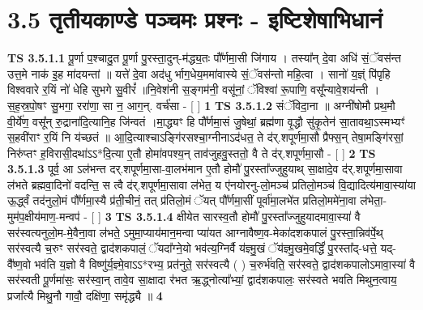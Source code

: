 \documentclass[17pt]{extarticle}
\begin{document}
     \section*{ 3.5      तृतीयकाण्डे पञ्चमः प्रश्नः - इष्टिशेषाभिधानं }
                                        \textbf{ TS 3.5.1.1} \newline
                  पू॒र्णा प॒श्चादु॒त पू॒र्णा पु॒रस्ता॒दुन्-म॑द्ध्य॒तः पौ᳚र्णमा॒सी जि॑गाय । तस्या᳚न् दे॒वा अधि॑ सं॒ॅवस॑न्त उत्त॒मे नाक॑ इ॒ह मा॑दयन्तां ॥ यत्ते॑ दे॒वा अद॑धु र्भाग॒धेय॒ममा॑वास्ये सं॒ॅवस॑न्तो महि॒त्वा । सानो॑ य॒ज्ञ्ं पि॑पृहि विश्ववारे र॒यिं नो॑ धेहि सुभगे सु॒वीरं᳚ ॥नि॒वेश॑नी स॒ङ्गम॑नी॒ वसू॑नां॒ ॅविश्वा॑ रू॒पाणि॒ वसू᳚न्यावे॒शय॑न्ती । स॒ह॒स्र॒पो॒षꣳ सु॒भगा॒ ररा॑णा॒ सा न॒ आग॒न्. वर्च॑सा - [  ] \textbf{  1} \newline
                  \newline
                                \textbf{ TS 3.5.1.2} \newline
                  संॅविदा॒ना ॥ अग्नी॑षोमौ प्रथ॒मौ वी॒र्ये॑ण॒ वसू᳚न् रु॒द्राना॑दि॒त्यानि॒ह जि॑न्वतं ।मा॒द्ध्यꣳ हि पौ᳚र्णमा॒सं जु॒षेथां॒ ब्रह्म॑णा वृ॒द्धौ सु॑कृ॒तेन॑ सा॒तावथा॒ऽस्मभ्यꣳ॑ स॒हवी॑राꣳ र॒यिं नि य॑च्छतं ॥ आ॒दि॒त्याश्चाऽङ्गि॑रसश्चा॒ग्नीनाऽद॑धत॒ ते द॑र्.शपूर्णमा॒सौ प्रैफ्स॒न् तेषा॒मङ्गि॑रसां॒ निरु॑प्तꣳ ह॒विरासी॒दथा॑ऽऽ*दि॒त्या ए॒तौ होमा॑वपश्य॒न् ताव॑जुहवु॒स्ततो॒ वै ते द॑र्.शपूर्णमा॒सौ - [  ] \textbf{  2} \newline
                  \newline
                                \textbf{ TS 3.5.1.3} \newline
                  पूर्व॒ आ ऽल॑भन्त दर्.शपूर्णमा॒सा-वा॒लभ॑मान ए॒तौ होमौ॑ पु॒रस्ता᳚ज्जुहुयाथ् सा॒क्षादे॒व द॑र्.शपूर्णमा॒सावा ल॑भते ब्रह्मवा॒दिनो॑ वदन्ति॒ स त्वै द॑र्.शपूर्णमा॒सावा ल॑भेत॒ य ए॑नयोरनु-लो॒मञ्च॑ प्रतिलो॒मञ्च॑ वि॒द्यादित्य॑मावा॒स्या॑या ऊ॒र्द्ध्वं तद॑नुलो॒मं पौ᳚र्णमा॒स्यै प्र॑ती॒चीनं॒ तत् प्र॑तिलो॒मं ॅयत् पौ᳚र्णमा॒सीं पूर्वा॑मा॒लभे॑त प्रतिलो॒ममे॑ना॒वा ल॑भेता॒-मुम॑प॒क्षीय॑माण॒-मन्वप॑ - [  ] \textbf{  3} \newline
                  \newline
                                \textbf{ TS 3.5.1.4} \newline
                  क्षीयेत सारस्व॒तौ होमौ॑ पु॒रस्ता᳚ज्जुहुयादमावा॒स्या॑ वै सर॑स्वत्यनुलो॒म-मे॒वैना॒वा ल॑भते॒ ऽमुमा॒प्याय॑मान॒मन्वा प्या॑यत आग्नावैष्ण॒व-मेका॑दशकपालं पु॒रस्ता॒न्निव॑र्पे॒थ् सर॑स्वत्यै च॒रुꣳ सर॑स्वते॒ द्वाद॑शकपालं॒ ॅयदा᳚ग्ने॒यो भव॑त्य॒ग्निर्वै य॑ज्ञ्मु॒खं ॅय॑ज्ञ्मु॒खमे॒वर्द्धिं॑ पु॒रस्ता᳚द्-धत्ते॒ यद्-वै᳚ष्ण॒वो भव॑ति य॒ज्ञो वै विष्णु॑र्य॒ज्ञ्मे॒वाऽऽ*रभ्य॒ प्रत॑नुते॒ सर॑स्वत्यै ( ) च॒रुर्भ॑वति॒ सर॑स्वते॒ द्वाद॑शकपालोऽमावा॒स्या॑ वै सर॑स्वती पू॒र्णमा॑सः॒ सर॑स्वा॒न् तावे॒व सा॒क्षादा र॑भत ऋ॒द्ध्नोत्या᳚भ्यां॒ द्वाद॑शकपालः॒ सर॑स्वते भवति मिथुन॒त्वाय॒ प्रजा᳚त्यै मिथु॒नौ गावौ॒ दक्षि॑णा॒ समृ॑द्ध्यै ॥ \textbf{  4} \newline
\end{document}
